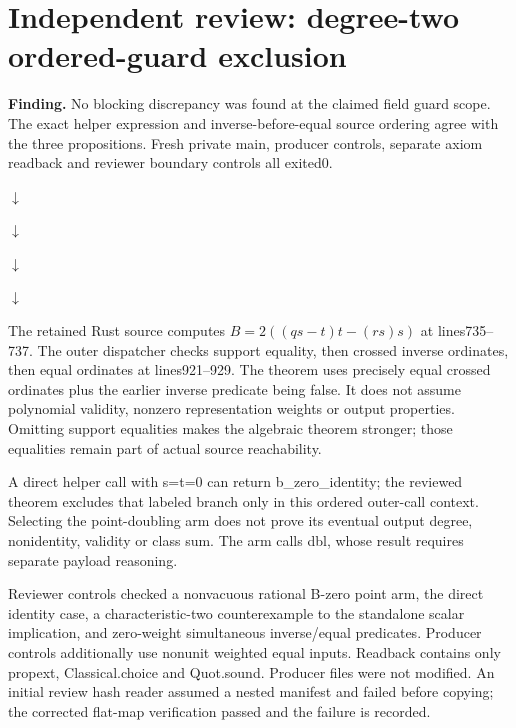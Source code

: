 \documentclass[10pt]{article}
\begin{document}
\section*{Independent review: degree-two ordered-guard exclusion}
\textbf{Finding.} No blocking discrepancy was found at the claimed field guard scope. The exact helper expression and inverse-before-equal source ordering agree with the three propositions. Fresh private main, producer controls, separate axiom readback and reviewer boundary controls all exited0.

\begin{center}\par $\downarrow$\par
{}\par $\downarrow$\par
{}\par $\downarrow$\par
{}\par $\downarrow$\par
{}\end{center}

The retained Rust source computes $B=2((qs-t)t-(rs)s)$ at lines735--737. The outer dispatcher checks support equality, then crossed inverse ordinates, then equal ordinates at lines921--929. The theorem uses precisely equal crossed ordinates plus the earlier inverse predicate being false. It does not assume polynomial validity, nonzero representation weights or output properties. Omitting support equalities makes the algebraic theorem stronger; those equalities remain part of actual source reachability.

A direct helper call with s=t=0 can return b\_zero\_identity; the reviewed theorem excludes that labeled branch only in this ordered outer-call context. Selecting the point-doubling arm does not prove its eventual output degree, nonidentity, validity or class sum. The arm calls dbl, whose result requires separate payload reasoning.

Reviewer controls checked a nonvacuous rational B-zero point arm, the direct identity case, a characteristic-two counterexample to the standalone scalar implication, and zero-weight simultaneous inverse/equal predicates. Producer controls additionally use nonunit weighted equal inputs. Readback contains only propext, Classical.choice and Quot.sound. Producer files were not modified. An initial review hash reader assumed a nested manifest and failed before copying; the corrected flat-map verification passed and the failure is recorded.
\end{document}
